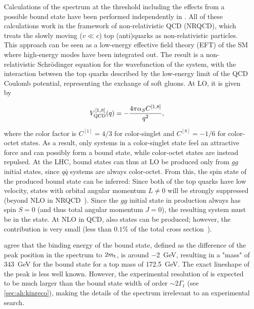 Calculations of the \mWWbb spectrum at the \ttbar threshold including the effects from a possible bound state have been performed independently in . All of these calculations work in the framework of non-relativistic QCD (NRQCD), which treats the slowly moving ($v \ll c$) top (anti)quarks as non-relativistic particles. This approach can be seen as a low-energy effective field theory (EFT) of the SM where high-energy modes have been integrated out. The result is a non-relativistic Schr\"odinger equation for the wavefunction of the \ttbar system, with the interaction between the top quarks described by the low-energy limit of the QCD Coulomb potential, representing the exchange of soft gluons. At LO, it is given by~\cite{Kiyo:2008bv}

\begin{equation}
    V_{\mathrm{QCD}}^{[1,8]} (q) = - \frac{4 \pi \alpha_S C^{[1,8]}}{q^2} ,
\end{equation}

\noindent where the color factor is $C^{[1]} = 4/3$ for color-singlet and $C^{[8]} = -1/6$ for color-octet states. As a result, only \ttbar systems in a color-singlet state feel an attractive force and can possibly form a bound state, while color-octet states are instead repulsed. At the LHC, \ttbar bound states can thus at LO be produced only from $gg$ initial states, since $q\bar{q}$ systems are always color-octet. From this, the spin state of the produced bound state can be inferred: Since both of the top quarks have low velocity, states with orbital angular momentum $L \neq 0$ will be strongly suppressed (beyond NLO in NRQCD~\cite{Kiyo:2008bv}). Since the $gg$ initial state in \ttbar production always has spin $S = 0$ (and thus total angular momentum $J = 0$), the resulting \ttbar system must be in the  state. At NLO in QCD, also  states can be produced; however, the contribution is very small (less than $0.1\%$ of the total cross section~\cite{Kiyo:2008bv}).

 agree that the binding energy of the \ttbar bound state, defined as the difference of the peak position in the \mWWbb spectrum to $2 m_{\mathrm{t}}$, is around \SI{-2}{\GeV}, resulting in a "mass" of \SI{343}{\GeV} for the \ttbar bound state for a top mass of \SI{172.5}{\GeV}. The exact lineshape of the peak is less well known. However, the experimental resolution of \mWWbb is expected to be much larger than the bound state width of order $\sim 2 \Gamma_t$ (see \cref{sec:ah:kinreco}), making the details of the spectrum irrelevant to an experimental search.

